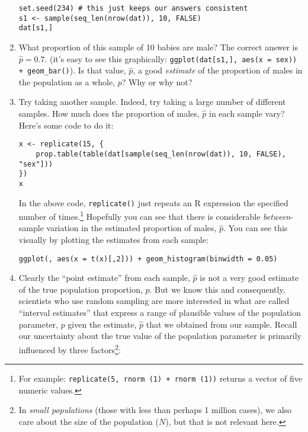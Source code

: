 \documentclass[a4paper,12pt]{article}
\begin{document}
\begin{enumerate}
\begin{verbatim}
set.seed(234) # this just keeps our answers consistent
s1 <- sample(seq_len(nrow(dat)), 10, FALSE)
dat[s1,]
\end{verbatim}

\item What proportion of this sample of 10 babies are male? The correct answer is $\hat{p}=0.7$. (it's easy to see this graphically: \texttt{ggplot(dat[s1,], aes(x = sex)) + geom\_bar()}). Is that value, $\hat{p}$, a good \textit{estimate} of the proportion of males in the population as a whole, $p$? Why or why not?

\item Try taking another sample. Indeed, try taking a large number of different samples. How much does the proportion of males, $\hat{p}$ in each sample vary? Here's some code to do it:

\begin{verbatim}
x <- replicate(15, {
    prop.table(table(dat[sample(seq_len(nrow(dat)), 10, FALSE), "sex"]))
})
x
\end{verbatim}

\noindent In the above code, \texttt{replicate()} just repeats an R expression the specified number of times.\footnote{For example: \texttt{replicate(5, rnorm (1) + rnorm (1))} returns a vector of five numeric values.} Hopefully you can see that there is considerable \textit{between}-sample variation in the estimated proportion of males, $\hat{p}$. You can see this visually by plotting the estimates from each sample:

\begin{verbatim}
ggplot(, aes(x = t(x)[,2])) + geom_histogram(binwidth = 0.05)
\end{verbatim}

\item Clearly the ``point estimate'' from each sample, $\hat{p}$ is not a very good estimate of the true population proportion, $p$. But we know this and consequently, scientists who use random sampling are more interested in what are called ``interval estimates'' that express a range of plausible values of the population parameter, $p$ given the estimate, $\hat{p}$ that we obtained from our sample. Recall our uncertainty about the true value of the population parameter is primarily influenced by three factors\footnote{In \textit{small populations} (those with less than perhaps 1 million cases), we also care about the size of the population ($N$), but that is not relevant here.}:


\end{enumerate}
\end{document}

